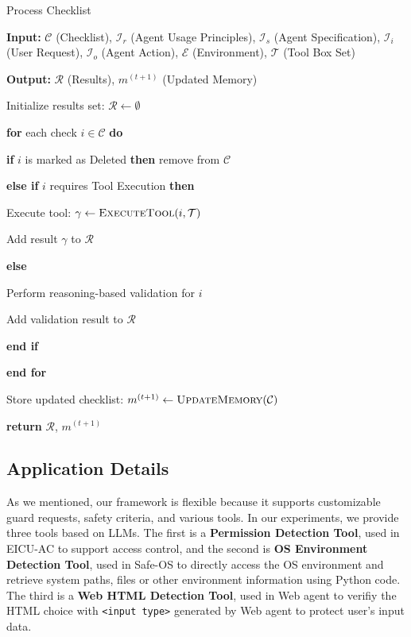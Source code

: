 \begin{algorithm}
\caption{Process Checklist}
\begin{algorithmic}[1]
\item \textbf{Input:} $\mathcal{C}$ (Checklist), $\mathcal{I}_r$ (Agent Usage Principles), $\mathcal{I}_s$ (Agent Specification), $\mathcal{I}_i$ (User Request), $\mathcal{I}_o$ (Agent Action), $\mathcal{E}$ (Environment), $\mathcal{T}$ (Tool Box Set)
\item \textbf{Output:} $\mathcal{R}$ (Results), $m^{(t+1)}$ (Updated Memory)
\item Initialize results set: $\mathcal{R}$$\gets \emptyset$
\item \textbf{for} each check $i \in \mathcal{C}$ \textbf{do}
\item \quad \textbf{if} $i$ is marked as Deleted \textbf{then} remove from $\mathcal{C}$
\item \quad \textbf{else if} $i$ requires Tool Execution \textbf{then}
\item \quad \quad Execute tool: $\gamma \gets \textsc{ExecuteTool}(i, \mathcal{T})$
\item \quad \quad Add result $\gamma$ to $\mathcal{R}$
\item \quad \textbf{else}
\item \quad \quad Perform reasoning-based validation for $i$
\item \quad \quad Add validation result to $\mathcal{R}$
\item \quad \textbf{end if}
\item \textbf{end for}
\item Store updated checklist: $m^{(t+1)} \gets \textsc{UpdateMemory}(\mathcal{C})$
\item \textbf{return} $\mathcal{R}$, $m^{(t+1)}$
\end{algorithmic}
\label{app:algorithm:process_checklist}
\end{algorithm}


\subsection{Application Details}
\label{app:method:application}
As we mentioned, our framework is flexible because it supports customizable guard requests, safety criteria, and various tools. In our experiments, we provide three tools based on LLMs. The first is a \textbf{Permission Detection Tool}, used in EICU-AC to support access control, and the second is \textbf{OS Environment Detection Tool}, used in Safe-OS to directly access the OS environment and retrieve system paths, files or other environment information using Python code. The third is a \textbf{Web HTML Detection Tool}, used in Web agent to verifiy the HTML choice with \texttt{<input type>} generated by Web agent to protect user's input data.


